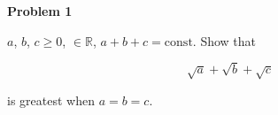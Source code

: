 \documentclass{article}
\begin{document}
{\bf Problem 1}

$a$, $b$, $c\geq0$, $\in \mathbb R$, $a+b+c=\mathrm{const}$. Show that

\begin{equation*}
\sqrt{a}+\sqrt{b}+\sqrt{c} 
  \end{equation*}

is greatest when $a=b=c$.
\end{document}
